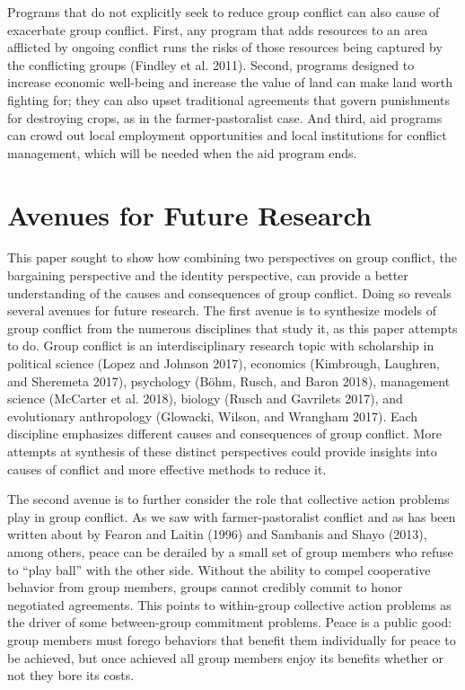 \documentclass[11pt]{article}
\begin{document}
Programs that do not explicitly seek to reduce group conflict can also
cause of exacerbate group conflict. First, any program that adds
resources to an area afflicted by ongoing conflict runs the risks of
those resources being captured by the conflicting groups (Findley et al.
2011). Second, programs designed to increase economic well-being and
increase the value of land can make land worth fighting for; they can
also upset traditional agreements that govern punishments for destroying
crops, as in the farmer-pastoralist case. And third, aid programs can
crowd out local employment opportunities and local institutions for
conflict management, which will be needed when the aid program ends.

\hypertarget{avenues-for-future-research}{%
\section{Avenues for Future
Research}\label{avenues-for-future-research}}

This paper sought to show how combining two perspectives on group
conflict, the bargaining perspective and the identity perspective, can
provide a better understanding of the causes and consequences of group
conflict. Doing so reveals several avenues for future research. The
first avenue is to synthesize models of group conflict from the numerous
disciplines that study it, as this paper attempts to do. Group conflict
is an interdisciplinary research topic with scholarship in political
science (Lopez and Johnson 2017), economics (Kimbrough, Laughren, and
Sheremeta 2017), psychology (Böhm, Rusch, and Baron 2018), management
science (McCarter et al. 2018), biology (Rusch and Gavrilets 2017), and
evolutionary anthropology (Glowacki, Wilson, and Wrangham 2017). Each
discipline emphasizes different causes and consequences of group
conflict. More attempts at synthesis of these distinct perspectives
could provide insights into causes of conflict and more effective
methods to reduce it.

The second avenue is to further consider the role that collective action
problems play in group conflict. As we saw with farmer-pastoralist
conflict and as has been written about by Fearon and Laitin (1996) and
Sambanis and Shayo (2013), among others, peace can be derailed by a
small set of group members who refuse to ``play ball'' with the other
side. Without the ability to compel cooperative behavior from group
members, groups cannot credibly commit to honor negotiated agreements.
This points to within-group collective action problems as the driver of
some between-group commitment problems. Peace is a public good: group
members must forego behaviors that benefit them individually for peace
to be achieved, but once achieved all group members enjoy its benefits
whether or not they bore its costs.
\end{document}
